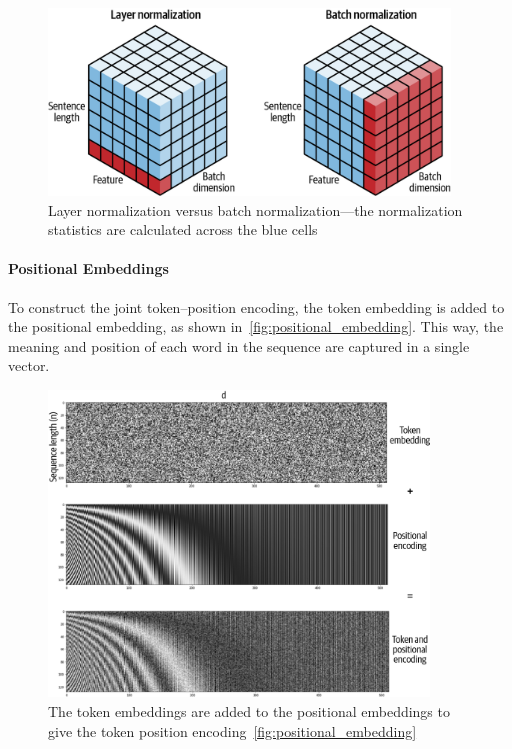 \begin{figure}
	\begin{center}
		\includegraphics[width=0.95\textwidth]{figures/layer_norm}
	\end{center}
	\caption{Layer normalization versus batch normalization—the normalization statistics are calculated across the blue cells~\cite{shen2020powernorm}}\label{fig:layer_norm}
\end{figure}

\paragraph{Positional Embeddings}

To construct the joint token–position encoding, the token embedding is added to the positional embedding, as shown in~\autoref{fig:positional_embedding}.
This way, the meaning and position of each word in the sequence are captured in a single vector.

\begin{figure}
	\begin{center}
		\includegraphics[width=0.9\textwidth]{figures/positional_embedding}
	\end{center}
	\caption{The token embeddings are added to the positional embeddings to give the token position encoding~\autoref{fig:positional_embedding}}\label{fig:positional_embedding}
\end{figure}

